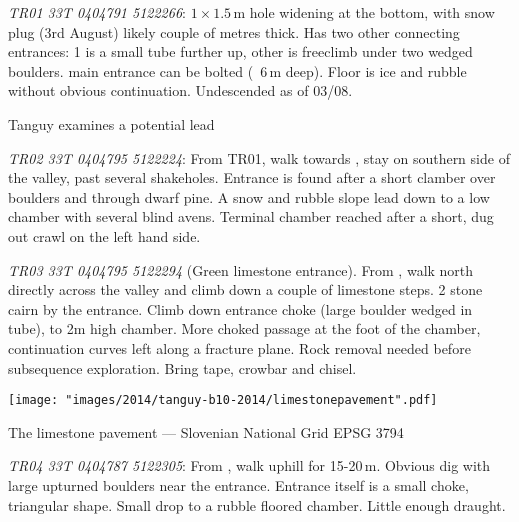 	
\begin{citemize}
	\item \emph{TR01 33T 0404791 5122266}: $1\times1.5$\,m hole widening at the bottom, with snow plug (3rd August) likely couple of metres thick. Has two other connecting entrances: 1 is a small tube further up, other is freeclimb under two wedged boulders. main entrance can be bolted (~6\,m deep). Floor is ice and rubble without obvious continuation. Undescended as of 03/08.
 
\begin{marginfigure}
        		\centering
        		\caption{Tanguy examines a potential lead }
		\label{cave in pavement}
        \end{marginfigure}

	\item \emph{TR02 33T 0404795 5122224}: From TR01, walk towards , stay on southern side of the valley, past several shakeholes. Entrance is found after a short clamber over boulders and through dwarf pine.  A snow and rubble slope lead down to a low chamber with several blind avens. Terminal chamber reached after a short, dug out crawl on the left hand side.

	\item \emph{TR03 33T 0404795 5122294} (Green limestone entrance). From , walk north directly across the valley and climb down a couple of limestone steps. 2 stone cairn by the entrance.  Climb down entrance choke (large boulder wedged in tube), to 2m high chamber. More choked passage at the foot of the chamber, continuation curves left along a fracture plane. Rock removal needed before subsequence exploration. Bring tape, crowbar and chisel.
	
\begin{pagemap}
	\checkoddpage \ifoddpage \forcerectofloat \else \forceversofloat \fi
	\centering
	
	\texttt{[image: "images/2014/tanguy-b10-2014/limestonepavement".pdf]}
	
	\label{map pavement}
	\caption{The limestone pavement --- Slovenian National Grid EPSG 3794}
\end{pagemap}
	
	\item \emph{TR04 33T 0404787 5122305}: From , walk uphill for 15-20\,m. Obvious dig with large upturned boulders near the entrance. Entrance itself is a small choke, triangular shape. Small drop to a rubble floored chamber. Little enough draught.


\end{citemize}
